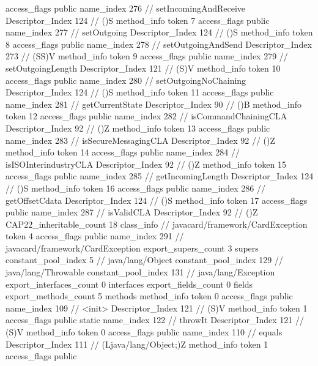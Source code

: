 {{{{{					access_flags	public
					name_index	276		// setIncomingAndReceive
					Descriptor_Index	124		// ()S
				}
				method_info {
					token	7
					access_flags	public
					name_index	277		// setOutgoing
					Descriptor_Index	124		// ()S
				}
				method_info {
					token	8
					access_flags	public
					name_index	278		// setOutgoingAndSend
					Descriptor_Index	273		// (SS)V
				}
				method_info {
					token	9
					access_flags	public
					name_index	279		// setOutgoingLength
					Descriptor_Index	121		// (S)V
				}
				method_info {
					token	10
					access_flags	public
					name_index	280		// setOutgoingNoChaining
					Descriptor_Index	124		// ()S
				}
				method_info {
					token	11
					access_flags	public
					name_index	281		// getCurrentState
					Descriptor_Index	90		// ()B
				}
				method_info {
					token	12
					access_flags	public
					name_index	282		// isCommandChainingCLA
					Descriptor_Index	92		// ()Z
				}
				method_info {
					token	13
					access_flags	public
					name_index	283		// isSecureMessagingCLA
					Descriptor_Index	92		// ()Z
				}
				method_info {
					token	14
					access_flags	public
					name_index	284		// isISOInterindustryCLA
					Descriptor_Index	92		// ()Z
				}
				method_info {
					token	15
					access_flags	public
					name_index	285		// getIncomingLength
					Descriptor_Index	124		// ()S
				}
				method_info {
					token	16
					access_flags	public
					name_index	286		// getOffsetCdata
					Descriptor_Index	124		// ()S
				}
				method_info {
					token	17
					access_flags	public
					name_index	287		// isValidCLA
					Descriptor_Index	92		// ()Z
				}
			}
			CAP22_inheritable_count	18
		}
		class_info {		// javacard/framework/CardException
			token	4
			access_flags	public
			name_index	291		// javacard/framework/CardException
			export_supers_count	3
			supers {
				constant_pool_index	5		// java/lang/Object
				constant_pool_index	129		// java/lang/Throwable
				constant_pool_index	131		// java/lang/Exception
			}
			export_interfaces_count	0
			interfaces {
			}
			export_fields_count	0
			fields {
			}
			export_methods_count	5
			methods {
				method_info {
					token	0
					access_flags	public
					name_index	109		// <init>
					Descriptor_Index	121		// (S)V
				}
				method_info {
					token	1
					access_flags	public static
					name_index	122		// throwIt
					Descriptor_Index	121		// (S)V
				}
				method_info {
					token	0
					access_flags	public
					name_index	110		// equals
					Descriptor_Index	111		// (Ljava/lang/Object;)Z
				}
				method_info {
					token	1
					access_flags	public
}}}}}
